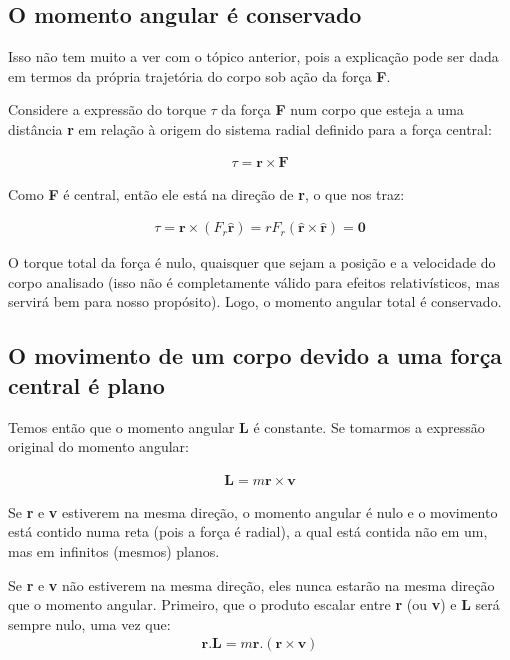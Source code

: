 \subsection{O momento angular é conservado}

Isso não tem muito a ver com o tópico anterior, pois a explicação pode ser dada em termos da própria trajetória do corpo sob ação da força \textbf{F}. {\\}

Considere a expressão do torque $\tau$ da força \textbf{F} num corpo que esteja a uma distância \textbf{r} em relação à origem do sistema radial definido para a força central:

\begin{eqnarray}
	\tau = \mathbf{r} \times \mathbf{F} \label{eq19}
\end{eqnarray}

Como \textbf{F} é central, então ele está na direção de \textbf{r}, o que nos traz:

\begin{eqnarray}
	\tau = \mathbf{r} \times (F_r\mathbf{\hat{r}}) = rF_r(\mathbf{\hat{r}} \times \mathbf{\hat{r}}) = \mathbf{0} \label{eq20}
\end{eqnarray}

O torque total da força é nulo, quaisquer que sejam a posição e a velocidade do corpo analisado (isso não é completamente válido para efeitos relativísticos, mas servirá bem para nosso propósito). Logo, o momento angular total é conservado.

\subsection{O movimento de um corpo devido a uma força central é plano}

Temos então que o momento angular \textbf{L} é constante. Se tomarmos a expressão original do momento angular:

\begin{eqnarray}
	\mathbf{L} = m\mathbf{r} \times \mathbf{v} \label{extra01}
\end{eqnarray}

Se \textbf{r} e \textbf{v} estiverem na mesma direção, o momento angular é nulo e o movimento está contido numa reta (pois a força é radial), a qual está contida não em um, mas em infinitos (mesmos) planos.{\\}

Se \textbf{r} e \textbf{v} não estiverem na mesma direção, eles nunca estarão na mesma direção que o momento angular. Primeiro, que o produto escalar entre \textbf{r} (ou \textbf{v}) e \textbf{L} será sempre nulo, uma vez que:
\begin{eqnarray}
	\mathbf{r.L} = m\mathbf{r}.(\mathbf{r} \times \mathbf{v}) \label{extra02}
\end{eqnarray}

